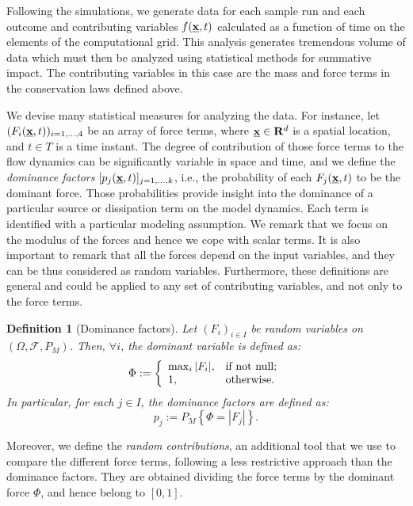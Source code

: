 \documentclass{article}
\newtheorem{definition}[theorem]{Definition}
\begin{document}
Following the simulations, we generate data for each sample run and each outcome and contributing variables $f(\underline{\textbf x},t)$ calculated as a function of time on the elements of the computational grid. This analysis generates tremendous volume of data which must then be analyzed using statistical methods for summative impact. The contributing variables in this case are the mass and force terms in the conservation laws defined above.

We devise many statistical measures for analyzing the data. For instance, let $(F_i(\underline{\textbf x},t))_{i=1,\dots, 4}$ be an array of force terms, where $\underline{\textbf x}\in \mathbf R^d$ is a spatial location, and $t\in T$ is a time instant. The degree of contribution of those force terms to the flow dynamics can be significantly variable in space and time, and we define the \emph{dominance factors} $[p_j(\underline{\textbf x},t)]_{j=1,\dots, k}$, i.e., the probability of each $F_j(\underline{\textbf x},t)$ to be the dominant force. Those probabilities provide insight into the dominance of a particular source or dissipation term on the model dynamics. Each term is identified with a particular modeling assumption. We remark that we focus on the modulus of the forces and hence we cope with scalar terms. It is also important to remark that all the forces depend on the input variables, and they can be thus considered as random variables. Furthermore, these definitions are general and could be applied to any set of contributing variables, and not only to the force terms.

\begin{definition}[Dominance factors]
Let $(F_i)_{i\in I}$ be random variables on $(\Omega, \mathcal F, P_M)$. Then, $\forall i$, the dominant variable is defined as:
$$\Phi:=\left\{
    \begin{array}{ll}
      \max_i |F_i|, & \hbox{if not null;} \\
      1, & \hbox{otherwise.}
    \end{array}
  \right.$$
In particular, for each $j \in I$, the dominance factors are defined as:
$$p_j:=P_M\left\{\Phi=|F_j|\right\}.$$
\end{definition}

Moreover, we define the \emph{random contributions}, an additional tool that we use to compare the different force terms, following a less restrictive approach than the dominance factors. They are obtained dividing the force terms by the dominant force $\Phi$, and hence belong to $[0,1]$.
\end{document}
